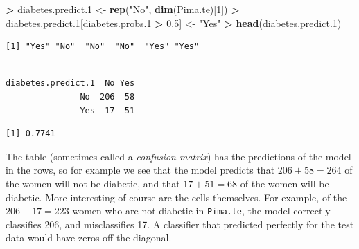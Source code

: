 \documentclass[]{krantz}
\makeatletter
\newenvironment{Shaded}{\begin{snugshade}}{\end{snugshade}}
\newcommand{\DecValTok}[1]{\textcolor[rgb]{0.06,0.06,0.06}{#1}}
\newcommand{\FloatTok}[1]{\textcolor[rgb]{0.06,0.06,0.06}{#1}}
\newcommand{\KeywordTok}[1]{\textcolor[rgb]{0.27,0.27,0.27}{\textbf{#1}}}
\newcommand{\NormalTok}[1]{#1}
\newcommand{\OperatorTok}[1]{\textcolor[rgb]{0.43,0.43,0.43}{\textbf{#1}}}
\newcommand{\StringTok}[1]{\textcolor[rgb]{0.5,0.5,0.5}{#1}}
\newenvironment{kframe}{%
\medskip{}
\setlength{\fboxsep}{.8em}
 \def\at@end@of@kframe{}%
 \ifinner\ifhmode%
  \def\at@end@of@kframe{\end{minipage}}%
  \begin{minipage}{\columnwidth}%
 \fi\fi%
 \def\FrameCommand##1{\hskip\@totalleftmargin \hskip-\fboxsep
 \colorbox{shadecolor}{##1}\hskip-\fboxsep
     \hskip-\linewidth \hskip-\@totalleftmargin \hskip\columnwidth}%
 \MakeFramed {\advance\hsize-\width
   \@totalleftmargin\z@ \linewidth\hsize
   \@setminipage}}%
 {\par\unskip\endMakeFramed%
 \at@end@of@kframe}
\renewenvironment{Shaded}{\begin{kframe}}{\end{kframe}}
\makeatother
\begin{document}
\begin{Shaded}
\begin{Highlighting}[]
\OperatorTok{>}\StringTok{ }\NormalTok{diabetes.predict}\FloatTok{.1}\NormalTok{ <-}\StringTok{ }\KeywordTok{rep}\NormalTok{(}\StringTok{"No"}\NormalTok{, }\KeywordTok{dim}\NormalTok{(Pima.te)[}\DecValTok{1}\NormalTok{])}
\OperatorTok{>}\StringTok{ }\NormalTok{diabetes.predict}\FloatTok{.1}\NormalTok{[diabetes.probs}\FloatTok{.1} \OperatorTok{>}\StringTok{ }\FloatTok{0.5}\NormalTok{] <-}\StringTok{ "Yes"}
\OperatorTok{>}\StringTok{ }\KeywordTok{head}\NormalTok{(diabetes.predict}\FloatTok{.1}\NormalTok{)}
\end{Highlighting}
\end{Shaded}

\begin{verbatim}
[1] "Yes" "No"  "No"  "No"  "Yes" "Yes"
\end{verbatim}

\begin{Shaded}
\end{Shaded}

\begin{verbatim}
                  
diabetes.predict.1  No Yes
               No  206  58
               Yes  17  51
\end{verbatim}

\begin{Shaded}
\end{Shaded}

\begin{verbatim}
[1] 0.7741
\end{verbatim}

The table (sometimes called a \emph{confusion matrix}) has the predictions of the model in the rows, so for example we see that the model predicts that \(206 + 58 = 264\) of the women will not be diabetic, and that \(17+51 = 68\) of the women will be diabetic. More interesting of course are the cells themselves. For example, of the \(206 + 17 = 223\) women who are not diabetic in \texttt{Pima.te}, the model correctly classifies 206, and misclassifies 17. A classifier that predicted perfectly for the test data would have zeros off the diagonal.
\end{document}
